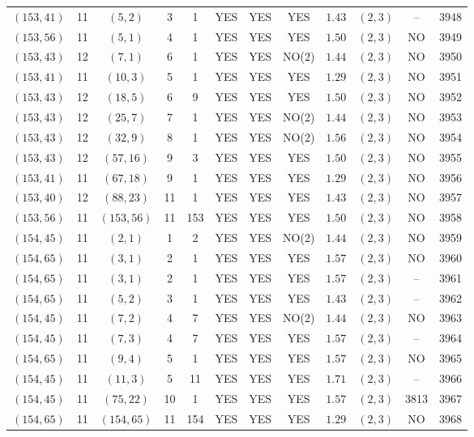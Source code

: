 \begin{longtable}{|c|c|c|c|c|c|c|c|c|c|c|c|}
$(153,41)$ & 11 & $(5,2)$ & 3 & 1 & YES & YES & YES & $1.43$ & $(2,3)$ & -- & 3948\\
$(153,56)$ & 11 & $(5,1)$ & 4 & 1 & YES & YES & YES & $1.50$ & $(2,3)$ & NO & 3949\\
$(153,43)$ & 12 & $(7,1)$ & 6 & 1 & YES & YES & NO(2) & $1.44$ & $(2,3)$ & NO & 3950\\
$(153,41)$ & 11 & $(10,3)$ & 5 & 1 & YES & YES & YES & $1.29$ & $(2,3)$ & NO & 3951\\
$(153,43)$ & 12 & $(18,5)$ & 6 & 9 & YES & YES & YES & $1.50$ & $(2,3)$ & NO & 3952\\
$(153,43)$ & 12 & $(25,7)$ & 7 & 1 & YES & YES & NO(2) & $1.44$ & $(2,3)$ & NO & 3953\\
$(153,43)$ & 12 & $(32,9)$ & 8 & 1 & YES & YES & NO(2) & $1.56$ & $(2,3)$ & NO & 3954\\
$(153,43)$ & 12 & $(57,16)$ & 9 & 3 & YES & YES & YES & $1.50$ & $(2,3)$ & NO & 3955\\
$(153,41)$ & 11 & $(67,18)$ & 9 & 1 & YES & YES & YES & $1.29$ & $(2,3)$ & NO & 3956\\
$(153,40)$ & 12 & $(88,23)$ & 11 & 1 & YES & YES & YES & $1.43$ & $(2,3)$ & NO & 3957\\
$(153,56)$ & 11 & $(153,56)$ & 11 & 153 & YES & YES & YES & $1.50$ & $(2,3)$ & NO & 3958\\
$(154,45)$ & 11 & $(2,1)$ & 1 & 2 & YES & YES & NO(2) & $1.44$ & $(2,3)$ & NO & 3959\\
$(154,65)$ & 11 & $(3,1)$ & 2 & 1 & YES & YES & YES & $1.57$ & $(2,3)$ & NO & 3960\\
$(154,65)$ & 11 & $(3,1)$ & 2 & 1 & YES & YES & YES & $1.57$ & $(2,3)$ & -- & 3961\\
$(154,65)$ & 11 & $(5,2)$ & 3 & 1 & YES & YES & YES & $1.43$ & $(2,3)$ & -- & 3962\\
$(154,45)$ & 11 & $(7,2)$ & 4 & 7 & YES & YES & NO(2) & $1.44$ & $(2,3)$ & NO & 3963\\
$(154,45)$ & 11 & $(7,3)$ & 4 & 7 & YES & YES & YES & $1.57$ & $(2,3)$ & -- & 3964\\
$(154,65)$ & 11 & $(9,4)$ & 5 & 1 & YES & YES & YES & $1.57$ & $(2,3)$ & NO & 3965\\
$(154,45)$ & 11 & $(11,3)$ & 5 & 11 & YES & YES & YES & $1.71$ & $(2,3)$ & -- & 3966\\
$(154,45)$ & 11 & $(75,22)$ & 10 & 1 & YES & YES & YES & $1.57$ & $(2,3)$ & 3813 & 3967\\
$(154,65)$ & 11 & $(154,65)$ & 11 & 154 & YES & YES & YES & $1.29$ & $(2,3)$ & NO & 3968\\

\end{longtable}
